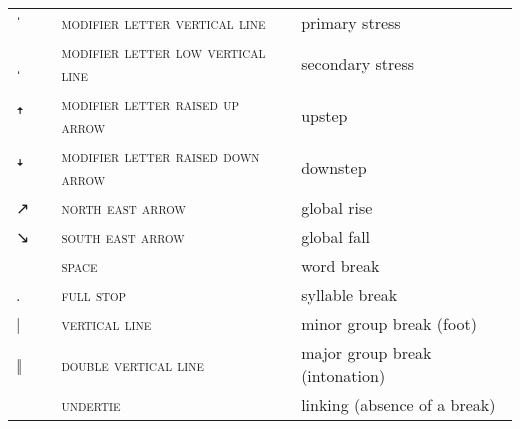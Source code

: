 \label{tab:ipa_boundaries}
 \tablelasttail{\bottomrule}

\begin{center}
\begin{xtabular}{ l L{1.2cm} L{5.4cm} L{4cm} }
{\large ˈ} &  & \textsc{modifier letter vertical line} & primary stress \\
{\large ˌ} &  & \textsc{modifier letter low vertical line} & secondary stress \\
{ꜛ} &  & \textsc{modifier letter raised up arrow} & upstep \\
{ꜜ} &  & \textsc{modifier letter raised down arrow} & downstep \\
{↗} &  & \textsc{north east arrow} & global rise \\
{↘} &  & \textsc{south east arrow} & global fall \\
 &  & \textsc{space} & word break \\
{\large.} &  & \textsc{full stop} & syllable break \\
{|} &  & \textsc{vertical line} & minor group break (foot) \\
{‖} &  & \textsc{double vertical line} & major group break (intonation) \\
 &  & \textsc{undertie} & linking (absence of a break) \\
\end{xtabular}
\end{center}